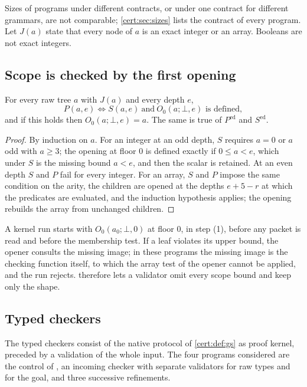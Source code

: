 Sizes of programs under different contracts, or under one contract for
different grammars, are not comparable; \cref{cert:sec:sizes} lists the
contract of every program. Let $J(a)$ state that every node of $a$ is an exact
integer or an array. Booleans are not exact integers.

\subsection{Scope is checked by the first opening}

\begin{lemma}\label{cert:lem:scope}
For every raw tree $a$ with $J(a)$ and every depth $e$,
\[
P(a,e)\iff S(a,e)\ \text{and}\ O_0(a;\bot,e)\text{ is defined},
\]
and if this holds then $O_0(a;\bot,e)=a$. The same is true of
$P^{\mathrm{ed}}$ and $S^{\mathrm{ed}}$.
\end{lemma}
\begin{proof}
By induction on $a$. For an integer at an odd depth, $S$ requires $a=0$ or $a$
odd with $a\ge 3$; the opening at floor $0$ is defined exactly if $0\le a<e$,
which under $S$ is the missing bound $a<e$, and then the scalar is retained.
At an even depth $S$ and $P$ fail for every integer. For an array, $S$ and
$P$ impose the same condition on the arity, the children are opened at the
depths $e+5-r$ at which the predicates are evaluated, and the induction
hypothesis applies; the opening rebuilds the array from unchanged children.
\end{proof}

A kernel run starts with $O_0(a_0;\bot,0)$ at floor $0$, in step (1), before
any packet is read and before the membership test. If a leaf violates its
upper bound, the opener consults the missing image; in these programs the
missing image is the checking function itself, to which the array test of the
opener cannot be applied, and the run rejects. 
therefore lets a validator omit every scope bound and keep only the shape.

\subsection{Typed checkers}

The typed checkers consist of the native protocol of \cref{cert:def:gs} as
proof kernel, preceded by a validation of the whole input. The four programs
considered are the control of , an incoming checker with
separate validators for raw types and for the goal, and three successive
refinements.

